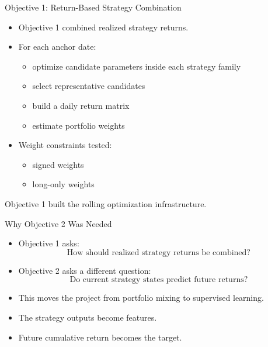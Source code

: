 \documentclass[aspectratio=169]{beamer}
\begin{document}
\begin{frame}{Objective 1: Return-Based Strategy Combination}
  \begin{itemize}
    \item Objective 1 combined realized strategy returns.
    \item For each anchor date:
    \begin{itemize}
      \item optimize candidate parameters inside each strategy family
      \item select representative candidates
      \item build a daily return matrix
      \item estimate portfolio weights
    \end{itemize}
    \item Weight constraints tested:
    \begin{itemize}
      \item signed weights
      \item long-only weights
    \end{itemize}
  \end{itemize}

  \vspace{0.6em}
  Objective 1 built the rolling optimization infrastructure.
\end{frame}

\begin{frame}{Why Objective 2 Was Needed}
  \begin{itemize}
    \item Objective 1 asks:
    \[
      \text{How should realized strategy returns be combined?}
    \]
    \item Objective 2 asks a different question:
    \[
      \text{Do current strategy states predict future returns?}
    \]
    \item This moves the project from portfolio mixing to supervised learning.
    \item The strategy outputs become features.
    \item Future cumulative return becomes the target.
  \end{itemize}
\end{frame}
\end{document}
